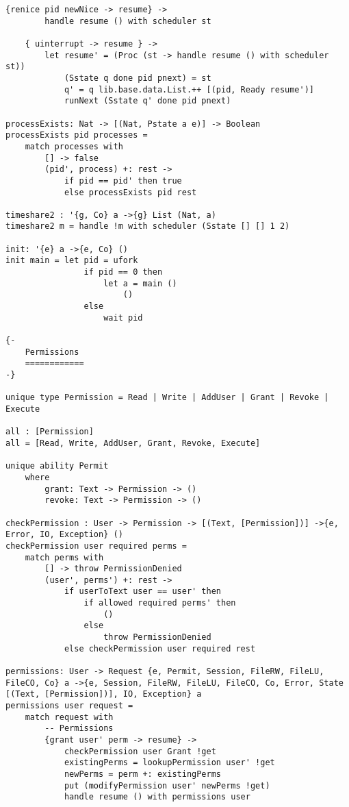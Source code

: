 \documentclass[logo,bsc,singlespacing,parskip]{infthesis}
\begin{document}
\begin{lstlisting}[language=unison]
    {renice pid newNice -> resume} -> 
        handle resume () with scheduler st
        
    { uinterrupt -> resume } -> 
        let resume' = (Proc (st -> handle resume () with scheduler st))
            (Sstate q done pid pnext) = st
            q' = q lib.base.data.List.++ [(pid, Ready resume')]
            runNext (Sstate q' done pid pnext)

processExists: Nat -> [(Nat, Pstate a e)] -> Boolean
processExists pid processes =
    match processes with
        [] -> false
        (pid', process) +: rest ->
            if pid == pid' then true
            else processExists pid rest

timeshare2 : '{g, Co} a ->{g} List (Nat, a)
timeshare2 m = handle !m with scheduler (Sstate [] [] 1 2)

init: '{e} a ->{e, Co} ()
init main = let pid = ufork
                if pid == 0 then
                    let a = main ()
                        ()
                else
                    wait pid

{-
    Permissions
    ============
-}

unique type Permission = Read | Write | AddUser | Grant | Revoke | Execute

all : [Permission]
all = [Read, Write, AddUser, Grant, Revoke, Execute]

unique ability Permit 
    where 
        grant: Text -> Permission -> ()
        revoke: Text -> Permission -> ()

checkPermission : User -> Permission -> [(Text, [Permission])] ->{e, Error, IO, Exception} ()
checkPermission user required perms =
    match perms with
        [] -> throw PermissionDenied
        (user', perms') +: rest ->
            if userToText user == user' then
                if allowed required perms' then
                    ()
                else
                    throw PermissionDenied
            else checkPermission user required rest

permissions: User -> Request {e, Permit, Session, FileRW, FileLU, FileCO, Co} a ->{e, Session, FileRW, FileLU, FileCO, Co, Error, State [(Text, [Permission])], IO, Exception} a
permissions user request = 
    match request with
        -- Permissions 
        {grant user' perm -> resume} -> 
            checkPermission user Grant !get
            existingPerms = lookupPermission user' !get 
            newPerms = perm +: existingPerms
            put (modifyPermission user' newPerms !get)
            handle resume () with permissions user
        

\end{lstlisting}
\end{document}
